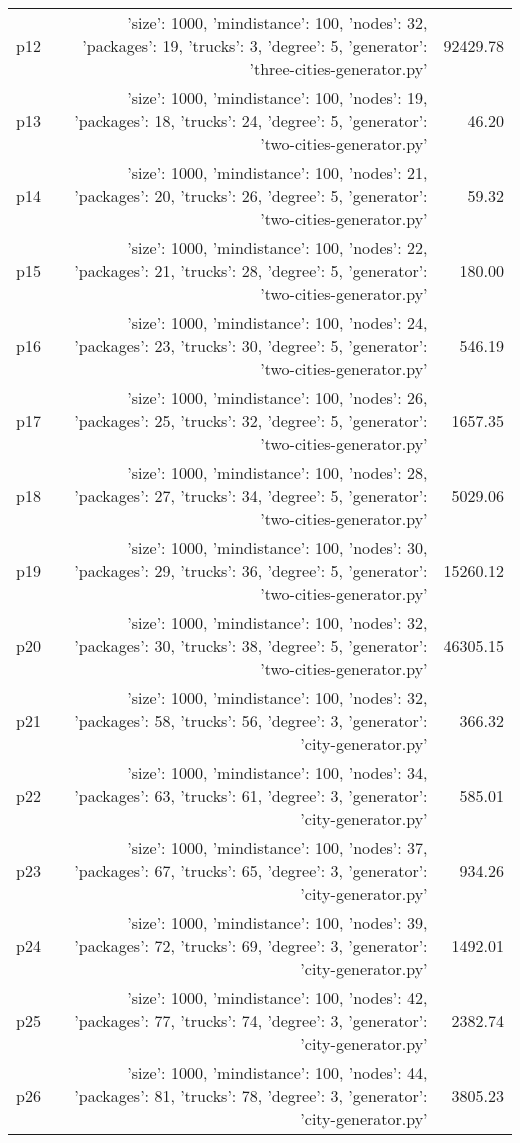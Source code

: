 \documentclass{article}
\begin{document}
\begin{center}
\begin{tabular}{@{}l|r|r@{}}
  p12&{'size': 1000, 'mindistance': 100, 'nodes': 32, 'packages': 19, 'trucks': 3, 'degree': 5, 'generator': 'three-cities-generator.py'}&92429.78\\
  p13&{'size': 1000, 'mindistance': 100, 'nodes': 19, 'packages': 18, 'trucks': 24, 'degree': 5, 'generator': 'two-cities-generator.py'}&46.20\\
  p14&{'size': 1000, 'mindistance': 100, 'nodes': 21, 'packages': 20, 'trucks': 26, 'degree': 5, 'generator': 'two-cities-generator.py'}&59.32\\
  p15&{'size': 1000, 'mindistance': 100, 'nodes': 22, 'packages': 21, 'trucks': 28, 'degree': 5, 'generator': 'two-cities-generator.py'}&180.00\\
  p16&{'size': 1000, 'mindistance': 100, 'nodes': 24, 'packages': 23, 'trucks': 30, 'degree': 5, 'generator': 'two-cities-generator.py'}&546.19\\
  p17&{'size': 1000, 'mindistance': 100, 'nodes': 26, 'packages': 25, 'trucks': 32, 'degree': 5, 'generator': 'two-cities-generator.py'}&1657.35\\
  p18&{'size': 1000, 'mindistance': 100, 'nodes': 28, 'packages': 27, 'trucks': 34, 'degree': 5, 'generator': 'two-cities-generator.py'}&5029.06\\
  p19&{'size': 1000, 'mindistance': 100, 'nodes': 30, 'packages': 29, 'trucks': 36, 'degree': 5, 'generator': 'two-cities-generator.py'}&15260.12\\
  p20&{'size': 1000, 'mindistance': 100, 'nodes': 32, 'packages': 30, 'trucks': 38, 'degree': 5, 'generator': 'two-cities-generator.py'}&46305.15\\
  p21&{'size': 1000, 'mindistance': 100, 'nodes': 32, 'packages': 58, 'trucks': 56, 'degree': 3, 'generator': 'city-generator.py'}&366.32\\
  p22&{'size': 1000, 'mindistance': 100, 'nodes': 34, 'packages': 63, 'trucks': 61, 'degree': 3, 'generator': 'city-generator.py'}&585.01\\
  p23&{'size': 1000, 'mindistance': 100, 'nodes': 37, 'packages': 67, 'trucks': 65, 'degree': 3, 'generator': 'city-generator.py'}&934.26\\
  p24&{'size': 1000, 'mindistance': 100, 'nodes': 39, 'packages': 72, 'trucks': 69, 'degree': 3, 'generator': 'city-generator.py'}&1492.01\\
  p25&{'size': 1000, 'mindistance': 100, 'nodes': 42, 'packages': 77, 'trucks': 74, 'degree': 3, 'generator': 'city-generator.py'}&2382.74\\
  p26&{'size': 1000, 'mindistance': 100, 'nodes': 44, 'packages': 81, 'trucks': 78, 'degree': 3, 'generator': 'city-generator.py'}&3805.23\\

\end{tabular}
\end{center}
\end{document}
